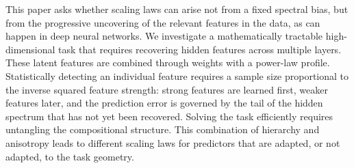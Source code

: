 \documentclass[]{article}
\numberwithin{equation}{section}
\theoremstyle{definition}
\begin{document}
This paper asks whether scaling laws can arise not from a fixed spectral bias, but from the progressive uncovering of the relevant features in the data, as can happen in deep neural networks. We investigate a mathematically tractable high-dimensional task that requires recovering hidden features across multiple layers. These latent features are combined through weights with a power-law profile. Statistically detecting an individual feature requires a sample size proportional to the inverse squared feature strength: strong features are learned first, weaker features later, and the prediction error is governed by the tail of the hidden spectrum that has not yet been recovered. Solving the task efficiently requires untangling the compositional structure. This combination of hierarchy and anisotropy leads to different scaling laws for predictors that are adapted, or not adapted, to the task geometry.
\end{document}
